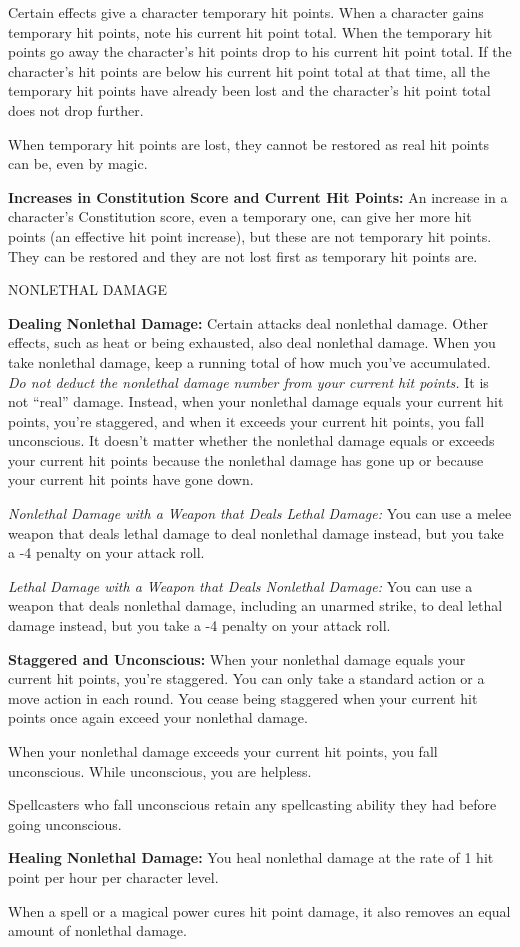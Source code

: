 \documentclass{article}
\begin{document}
Certain effects give a character temporary hit points. When a character gains temporary 
hit points, note his current hit point total. When the temporary hit points go 
away the character's hit points drop to his current hit point total. If the character's 
hit points are below his current hit point total at that time, all the temporary 
hit points have already been lost and the character's hit point total does not 
drop further.

When temporary hit points are lost, they cannot be restored as real hit points 
can be, even by magic.

\textbf{Increases in Constitution Score and Current Hit Points: }An increase in 
a character's Constitution score, even a temporary one, can give her more hit points 
(an effective hit point increase), but these are not temporary hit points. They 
can be restored and they are not lost first as temporary hit points are.

\vspace{12pt}
NONLETHAL DAMAGE

\textbf{Dealing Nonlethal Damage:} Certain attacks deal nonlethal damage. Other 
effects, such as heat or being exhausted, also deal nonlethal damage. When you 
take nonlethal damage, keep a running total of how much you've accumulated. \textit{Do 
not deduct the nonlethal damage number from your current hit points. }It is not 
``real'' damage. Instead, when your nonlethal damage equals your current hit points, 
you're staggered, and when it exceeds your current hit points, you fall unconscious. 
It doesn't matter whether the nonlethal damage equals or exceeds your current hit 
points because the nonlethal damage has gone up or because your current hit points 
have gone down.

\textit{Nonlethal Damage with a Weapon that Deals Lethal Damage: }You can use a 
melee weapon that deals lethal damage to deal nonlethal damage instead, but you 
take a -4 penalty on your attack roll.

\textit{Lethal Damage with a Weapon that Deals Nonlethal Damage: }You can use a 
weapon that deals nonlethal damage, including an unarmed strike, to deal lethal 
damage instead, but you take a -4 penalty on your attack roll.

\textbf{Staggered and Unconscious:} When your nonlethal damage equals your current 
hit points, you're staggered. You can only take a standard action or a move action 
in each round. You cease being staggered when your current hit points once again 
exceed your nonlethal damage.

When your nonlethal damage exceeds your current hit points, you fall unconscious. 
While unconscious, you are helpless.

Spellcasters who fall unconscious retain any spellcasting ability they had before 
going unconscious.

\textbf{Healing Nonlethal Damage:} You heal nonlethal damage at the rate of 1 hit 
point per hour per character level.

When a spell or a magical power cures hit point damage, it also removes an equal 
amount of nonlethal damage.

\newpage
\end{document}
